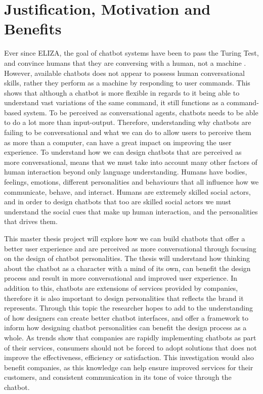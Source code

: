\section{Justification, Motivation and Benefits}
Ever since ELIZA, the goal of chatbot systems have been to pass the Turing Test, and convince humans that they are conversing with a human, not a machine \citep{McTear2016b}. However, available chatbots does not appear to possess human conversational skills, rather they perform as a machine by responding to user commands. This shows that although a chatbot is more flexible in regards to it being able to understand vast variations of the same command, it still functions as a command-based system. To be perceived as conversational agents, chatbots needs to be able to do a lot more than input-output. Therefore, understanding why chatbots are failing to be conversational and what we can do to allow users to perceive them as more than a computer, can have a great impact on improving the user experience. To understand how we can design chatbots that are perceived as more conversational, means that we must take into account many other factors of human interaction beyond only language understanding. Humans have bodies, feelings, emotions, different personalities and behaviours that all influence how we communicate, behave, and interact. Humans are extremely skilled social actors, and in order to design chatbots that too are skilled social actors we must understand the social cues that make up human interaction, and the personalities that drives them. 

This master thesis project will explore how we can build chatbots that offer a better user experience and are perceived as more conversational through focusing on the design of chatbot personalities. The thesis will understand how thinking about the chatbot as a character with a mind of its own, can benefit the design process and result in more conversational and improved user experience. In addition to this, chatbots are extensions of services provided by companies, therefore it is also important to design personalities that reflects the brand it represents. Through this topic the researcher hopes to add to the understanding of how designers can create better chatbot interfaces, and offer a framework to inform how designing chatbot personalities can benefit the design process as a whole. As trends show that companies are rapidly implementing chatbots as part of their services, consumers should not be forced to adopt solutions that does not improve the effectiveness, efficiency or satisfaction. This investigation would also benefit companies, as this knowledge can help ensure improved services for their customers, and consistent communication in its tone of voice through the chatbot.

